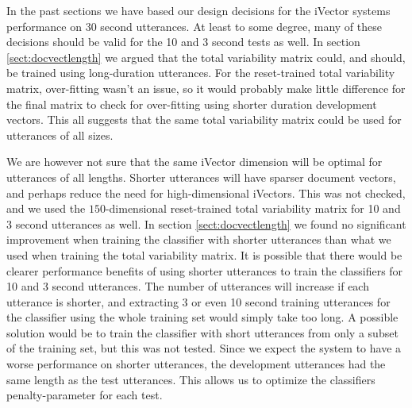 In the past sections we have based our design decisions for the iVector systems performance on 30 second utterances. At least to some degree, many of these decisions should be valid for the 10 and 3 second tests as well. In section \ref{sect:docvectlength} we argued that the total variability matrix could, and should, be trained using long-duration utterances. For the reset-trained total variability matrix, over-fitting wasn't an issue, so it would probably make little difference for the final matrix to check for over-fitting using shorter duration development vectors. This all suggests that the same total variability matrix could be used for utterances of all sizes. 

We are however not sure that the same iVector dimension will be optimal for utterances of all lengths. Shorter utterances will have sparser document vectors, and perhaps reduce the need for high-dimensional iVectors. This was not checked, and we used the $150$-dimensional reset-trained total variability matrix for 10 and 3 second utterances as well. In section \ref{sect:docvectlength} we found no significant improvement when training the classifier with shorter utterances than what we used when training the total variability matrix. It is possible that there would be clearer performance benefits of using shorter utterances to train the classifiers for 10 and 3 second utterances. The number of utterances will increase if each utterance is shorter, and extracting 3 or even 10 second training utterances for the classifier using the whole training set would simply take too long. A possible solution would be to train the classifier with short utterances from only a subset of the training set, but this was not tested. Since we expect the system to have a worse performance on shorter utterances, the development utterances had the same length as the test utterances.  This allows us to optimize the classifiers penalty-parameter for each test. 


















